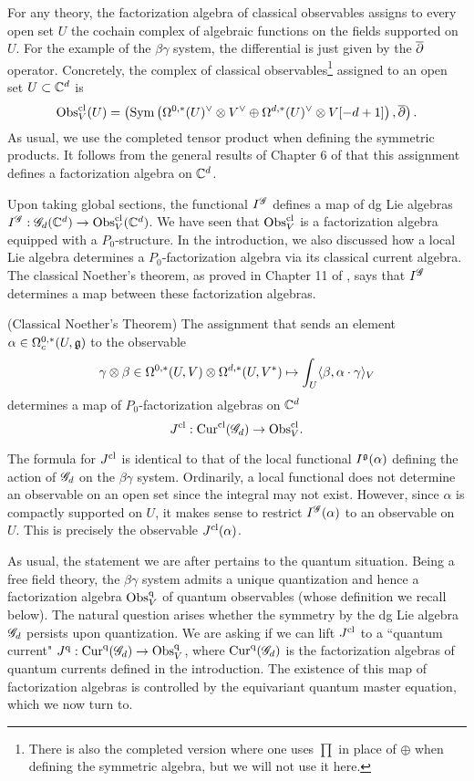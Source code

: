 For any theory, the factorization algebra of classical observables assigns to every open set $U$ the cochain complex of algebraic functions on the fields supported on $U$.  
For the example of the $\beta\gamma$ system, the differential is just given by the $\overline{\partial}$ operator. 
Concretely, the complex of classical observables\footnote{There is also the completed version where one uses $\prod$ in place of $\oplus$ when defining the symmetric algebra, but we will not use it here.} assigned to an open set $U \subset \mathbb C^d$ is
\[
{\rm Obs}^{{\rm cl}}_V(U) = \left({\rm Sym} \left(\Omega^{0,*}(U)^\vee \otimes V^\vee \oplus \Omega^{d,*}(U)^\vee \otimes V [-d+1]\right), \overline{\partial}\right) .
\]
As usual, we use the completed tensor product when defining the symmetric products. 
It follows from the general results of Chapter 6 of \cite{CG2} that this assignment defines a factorization algebra on $\mathbb C^d$. 

Upon taking global sections, the functional $I^{\mathscr G}$ defines a map of dg Lie algebras $I^{\mathscr G} : \mathscr G_d(\mathbb C^d) \to {\rm Obs}^{{\rm cl}}_V(\mathbb C^d)$.
We have seen that ${\rm Obs}_V^{{\rm cl}}$ is a factorization algebra equipped with a $P_0$-structure. 
In the introduction, we also discussed how a local Lie algebra determines a $P_0$-factorization algebra via its classical current algebra. 
The classical Noether's theorem, as proved in Chapter 11 of \cite{CG2}, says that $I^{\mathscr G}$ determines a map between these factorization algebras. 

\begin{prop}{\cite{[CG2]}} (Classical Noether's Theorem)
The assignment that sends an element $\alpha \in \Omega^{0,*}_c(U, \mathfrak g)$ to the observable
\[
\gamma \otimes \beta \in \Omega^{0,*}(U, V) \otimes \Omega^{d,*}(U, V^*) \mapsto \int_U \langle\beta, \alpha \cdot \gamma\rangle_V
\]
determines a map of $P_0$-factorization algebras on $\mathbb C^d$
\[
J^{{\rm cl}} : {\rm Cur}^{{\rm cl}} (\mathscr G_d) \to {\rm Obs}^{{\rm cl}}_V .
\]
\end{prop}

\begin{rmk}
The formula for $J^{{\rm cl}}$ is identical to that of the local functional $I^\mathfrak g(\alpha)$ defining the action of $\mathscr G_d$ on the $\beta\gamma$ system.
Ordinarily, a local functional does not determine an observable on an open set since the integral may not exist.
However, since $\alpha$ is compactly supported on $U$, it makes sense to restrict $I^\mathscr G (\alpha)$ to an observable on $U$. 
This is precisely the observable $J^{{\rm cl}}(\alpha)$. 
\end{rmk}

As usual, the statement we are after pertains to the quantum situation. 
Being a free field theory, the $\beta\gamma$ system admits a unique quantization and hence a factorization algebra ${\rm Obs}^{{\rm q}}_V$ of quantum observables (whose definition we recall below). 
The natural question arises whether the symmetry by the dg Lie algebra $\mathscr G_d$ persists upon quantization. 
We are asking if we can lift $J^{{\rm cl}}$ to a ``quantum current" $J^{{\rm q}} : {\rm Cur}^{\rm q}(\mathscr G_d) \to {\rm Obs}^{\rm q}_V$, where ${\rm Cur}^{\rm q}(\mathscr G_d)$ is the factorization algebras of quantum currents defined in the introduction. 
The existence of this map of factorization algebras is controlled by the equivariant quantum master equation, which we now turn to.

